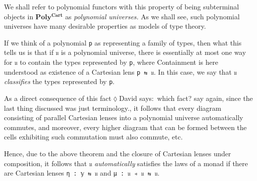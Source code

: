 \documentclass[
  11pt,
  oneside,
  article]{memoir}
\theoremstyle{definition}
\theoremstyle{plain}
\newcommand{\0}{\textsf{0}}
\newcommand{\1}{\tn{\textsf{1}}}
\newcommand{\dnote}[1]{{\quad \color{blue}$\lozenge$\;David says:}~#1\;{\color{blue}$\lozenge$}\quad}
\begin{document}
We shall refer to polynomial functors with this property of being
subterminal objects in \(\mathbf{Poly^{Cart}}\) as \emph{polynomial
universes.} As we shall see, such polynomial universes have many
desirable properties as models of type theory.

If we think of a polynomial \texttt{p} as representing a family of
types, then what this tells us is that if \texttt{𝔲} is a polynomial
universe, there is essentially at most one way for \texttt{𝔲} to contain
the types represented by \texttt{p}, where Containment is here
understood as  existence of a Cartesian lens \texttt{p\ ⇆\ 𝔲}. In this
case, we say that \texttt{𝔲} \emph{classifies} the types represented by
\texttt{p}.

As a direct consequence of this fact\dnote{which fact? say again, since the last thing discussed was just terminology.}, it follows that every diagram
consisting of parallel Cartesian lenses into a polynomial universe
automatically commutes, and moreover, every higher diagram that can be
formed between the cells exhibiting such commutation must also commute,
etc.

Hence, due to the above theorem
and the closure of Cartesian lenses under composition, it follows that \texttt{𝔲} \emph{automatically} satisfies the laws of a monad if there
are Cartesian lenses \texttt{η\ :\ 𝕪\ ⇆\ 𝔲} and
\texttt{μ\ :\ 𝔲\ ◃\ 𝔲\ ⇆\ 𝔲}.
\end{document}
